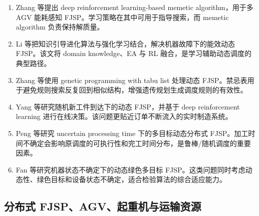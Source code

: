 \documentclass[UTF8,a4paper,11pt]{ctexart}
\begin{document}
\begin{enumerate}[label=\textbf{D\arabic*.},leftmargin=3em]
\item Zhang 等提出 deep reinforcement learning-based memetic algorithm，用于多 AGV 能耗感知 FJSP\cite{Zhang2024DDQN}。学习策略在其中可用于指导搜索，而 memetic algorithm 负责保持解质量。

\item Li 等把知识引导进化算法与强化学习结合，解决机器故障下的能效动态 FJSP\cite{Li2025KEARL}。该文将 domain knowledge、EA 与 RL 融合，是学习辅助动态调度的典型路径。

\item Zhang 等使用 genetic programming with tabu list 处理动态 FJSP\cite{Zhang2025GP}。禁忌表用于避免规则搜索反复回到相似结构，增强遗传规划生成调度规则的有效性。

\item Yang 等研究随机新工件到达下的动态 FJSP，并基于 deep reinforcement learning 进行在线决策\cite{Yang2025RandomArrival}。该问题更贴近订单不断流入的实时制造系统。

\item Peng 等研究 uncertain processing time 下的多目标动态分布式 FJSP\cite{Peng2025Uncertain}。加工时间不确定会影响原调度的可执行性和完工时间分布，是鲁棒/随机调度的重要因素。

\item Fan 等研究机器状态不确定下的动态绿色多目标 FJSP\cite{Fan2025DynamicGreen}。这类问题同时考虑动态性、绿色目标和设备状态不确定，适合检验算法的综合适应能力。
\end{enumerate}

\subsection{分布式 FJSP、AGV、起重机与运输资源}
\end{document}

